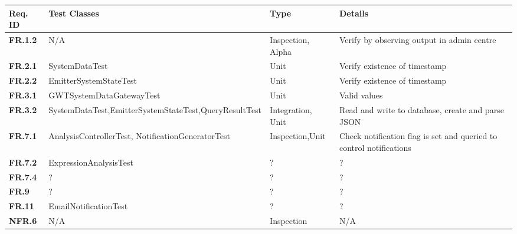 \documentclass[10pt,a4paper]{article}
\newcommand{\fr}[1]{\textcolor{reqColor}{\textbf{FR.#1}}}
\newcommand{\nfr}[1]{\textcolor{reqColor}{\textbf{NFR.#1}}}
\begin{document}
\begin{longtable}[H]{| p{1.5cm} | p{5cm}| p{1.8cm}| p{4.8cm}|}
  \hline\rowcolor{titleColor} \textbf{Req. ID} & \textbf{Test Classes} & \textbf{Type} & \textbf{Details}\\
  \hline \fr{1.2}   & N/A & Inspection, Alpha & Verify by observing output in admin centre\\
  \hline \fr{2.1}   & SystemDataTest & Unit & Verify existence of timestamp\\
  \hline \fr{2.2}   & EmitterSystemStateTest & Unit & Verify existence of timestamp\\
  \hline \fr{3.1}   & GWTSystemDataGatewayTest & Unit & Valid values\\
  \hline \fr{3.2}   & SystemDataTest,\newline EmitterSystemStateTest,\newline QueryResultTest & Integration, Unit & Read and write to database, create and parse JSON\\
  \hline \fr{7.1}   & AnalysisControllerTest, \newline NotificationGeneratorTest & Inspection,\newline Unit & Check notification flag is set and queried to control notifications\\
  \hline \fr{7.2}   & ExpressionAnalysisTest  & ? & ? \\
  \hline \fr{7.4}   & ?  & ? & ? \\
  \hline \fr{9}   & ?  & ? & ? \\
  \hline \fr{11}    & EmailNotificationTest  & ? & ? \\
  \hline \nfr{6}    & N/A  & Inspection & N/A \\
  \hline
\end{longtable}






\vfill


\end{document}
